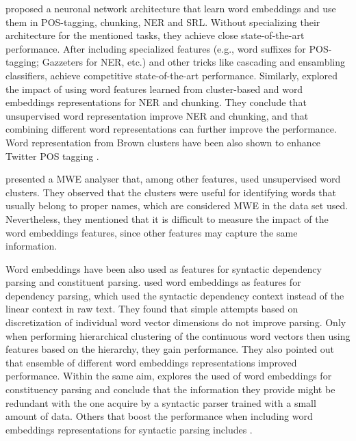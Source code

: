 \documentclass[11pt]{article}
\begin{document}
 proposed a neuronal network architecture
that learn word embeddings and use them in POS-tagging, chunking, NER and SRL. 
Without specializing their architecture for the mentioned tasks, they achieve close state-of-the-art performance. After including specialized features (e.g., word suffixes for POS-tagging;  Gazzeters for NER, etc.) and other tricks like cascading and ensambling classifiers, achieve competitive state-of-the-art performance.
Similarly,  explored the impact of using word
features learned from cluster-based and word embeddings representations
for NER and chunking. 
They conclude that unsupervised word representation improve NER and chunking, and that combining different word representations can further improve the performance.
Word representation from Brown clusters have been also shown to enhance
Twitter POS tagging . 

 presented a MWE analyser that, among other features, used unsupervised word clusters. 
They observed that the clusters were useful for identifying words that usually belong to proper names, which are considered MWE in the data set used. Nevertheless, they mentioned that it is difficult to measure the impact of the word embeddings features, since other features may capture the same information. 

Word embeddings have been also used as features for syntactic dependency parsing and constituent parsing. 
 used word embeddings as features for dependency parsing, which used the syntactic dependency context instead of the linear context in raw text. They found that simple attempts based on discretization of individual word vector dimensions do not improve parsing. Only when performing hierarchical clustering of the continuous word vectors then using features based on the hierarchy, they gain performance. They also pointed out that ensemble of different word embeddings representations improved performance.
Within the same aim, \cite{Andreas:Klein:2014} explores the used of word embeddings for constituency parsing and conclude that the
information they provide might be redundant with the one acquire by a syntactic parser trained with a small amount of data. Others that boost the performance when including word embeddings representations for syntactic parsing includes \cite{Koo:2008,Koo:2010,Haffari:2011,Tratz:2011}.
\end{document}
